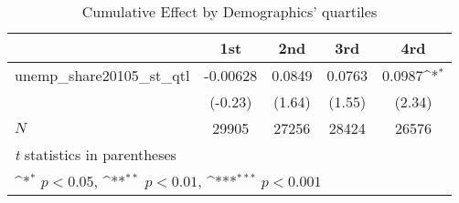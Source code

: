 \begin{table}[htbp]\centering
\def\sym#1{\ifmmode^{#1}\else\(^{#1}\)\fi}
\caption{Cumulative Effect by Demographics' quartiles}
\begin{tabular}{l*{4}{c}}
\hline\hline
            &\multicolumn{1}{c}{1st}&\multicolumn{1}{c}{2nd}&\multicolumn{1}{c}{3rd}&\multicolumn{1}{c}{4rd}\\
\hline
unemp\_share20105\_st\_qtl&    -0.00628         &      0.0849         &      0.0763         &      0.0987\sym{*}  \\
            &     (-0.23)         &      (1.64)         &      (1.55)         &      (2.34)         \\
\hline
\(N\)       &       29905         &       27256         &       28424         &       26576         \\
\hline\hline
\multicolumn{5}{l}{\footnotesize \textit{t} statistics in parentheses}\\
\multicolumn{5}{l}{\footnotesize \sym{*} \(p<0.05\), \sym{**} \(p<0.01\), \sym{***} \(p<0.001\)}\\
\end{tabular}
\end{table}

